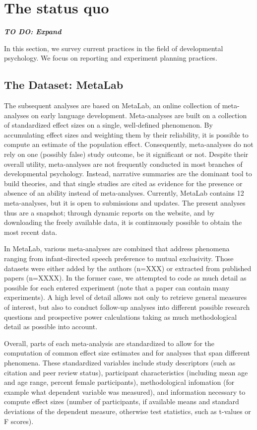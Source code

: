 \documentclass[english,floatsintext,man]{apa6}
\newcounter{author}
\begin{document}
\section{The status quo}\label{the-status-quo}

\textbf{\emph{TO DO: Expand }}

In this section, we survey current practices in the field of
developmental psychology. We focus on reporting and experiment planning
practices.

\subsection{The Dataset: MetaLab}\label{the-dataset-metalab}

The subsequent analyses are based on MetaLab, an online collection of
meta-analyses on early language development. Meta-analyses are built on
a collection of standardized effect sizes on a single, well-defined
phenomenon. By accumulating effect sizes and weighting them by their
reliability, it is possible to compute an estimate of the population
effect. Consequently, meta-analyses do not rely on one (possibly false)
study outcome, be it significant or not. Despite their overall utility,
meta-analyses are not frequently conducted in most branches of
developmental psychology. Instead, narrative summaries are the dominant
tool to build theories, and that single studies are cited as evidence
for the presence or absence of an ability instead of meta-analyses.
Currently, MetaLab contains 12 meta-analyses, but it is open to
submissions and updates. The present analyses thus are a snapshot;
through dynamic reports on the website, and by downloading the freely
available data, it is continuously possible to obtain the most recent
data.

In MetaLab, various meta-analyses are combined that address phenomena
ranging from infant-directed speech preference to mutual exclusivity.
Those datasets were either added by the authors (n=XXX) or extracted
from published papers (n=XXXX). In the former case, we attempted to code
as much detail as possible for each entered experiment (note that a
paper can contain many experiments). A high level of detail allows not
only to retrieve general measures of interest, but also to conduct
follow-up analyses into different possible research questions and
prospective power calculations taking as much methodological detail as
possible into account.

Overall, parts of each meta-analysis are standardized to allow for the
computation of common effect size estimates and for analyses that span
different phenomena. These standardized variables include study
descriptors (such as citation and peer review status), participant
characteristics (including mean age and age range, percent female
participants), methodological infomation (for example what dependent
variable was measured), and information necessary to compute effect
sizes (number of participants, if available means and standard
deviations of the dependent measure, otherwise test statistics, such as
t-values or F scores).
\end{document}

